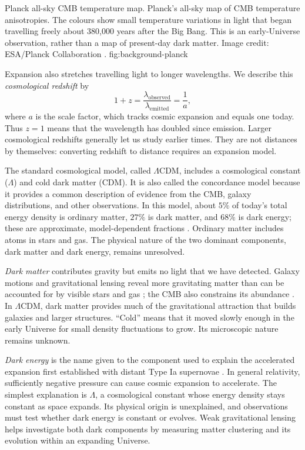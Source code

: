   {Planck all-sky CMB temperature map.}
  {Planck's all-sky map of CMB temperature anisotropies. The colours show
   small temperature variations in light that began travelling freely about
   380,000 years after the Big Bang. This is an early-Universe observation,
   rather than a map of present-day dark matter. Image credit:
   ESA/Planck Collaboration \citep{2020A&A...641A...1P}.}
  {fig:background-planck}

Expansion also stretches travelling light to longer wavelengths. We describe
this \emph{cosmological redshift} by
\begin{equation}
  1+z=\frac{\lambda_{\mathrm{observed}}}{\lambda_{\mathrm{emitted}}}
      =\frac{1}{a},
  \label{eq:cosmological-redshift}
\end{equation}
where $a$ is the scale factor, which tracks cosmic expansion and equals
one today. Thus $z=1$ means that the wavelength has doubled since emission.
Larger cosmological redshifts generally let us study earlier times. They
are not distances by themselves: converting redshift to distance requires
an expansion model.

The standard cosmological model, called $\Lambda$CDM, includes a cosmological
constant ($\Lambda$) and cold dark matter (CDM). It is also called the
concordance model because it provides a common description of evidence
from the CMB, galaxy distributions, and other observations. In this model,
about $5\%$ of today's total energy density is ordinary matter, $27\%$ is dark
matter, and $68\%$ is dark energy; these are approximate, model-dependent
fractions \citep{2020A&A...641A...6P}. Ordinary matter includes atoms in stars
and gas. The physical nature of the two dominant components, dark matter
and dark energy, remains unresolved.

\emph{Dark matter} contributes gravity but emits no light that we have
detected. Galaxy motions and gravitational lensing reveal more gravitating
matter than can be accounted for by visible stars and gas
\citep{2001PhR...340..291B}; the CMB also constrains its abundance
\citep{2020A&A...641A...6P}. In $\Lambda$CDM, dark matter provides much of
the gravitational attraction that builds galaxies and larger structures.
``Cold'' means that it moved slowly enough in the early Universe for small
density fluctuations to grow. Its microscopic nature remains unknown.

\emph{Dark energy} is the name given to the component used to explain the
accelerated expansion first established with distant Type Ia supernovae
\citep{1998AJ....116.1009R}. In general relativity, sufficiently negative
pressure can cause cosmic expansion to accelerate. The simplest explanation
is $\Lambda$, a cosmological constant whose energy density stays constant
as space expands. Its physical origin is unexplained, and observations must
test whether dark energy is constant or evolves. Weak gravitational lensing
helps investigate both dark components by measuring matter clustering and
its evolution within an expanding Universe.

